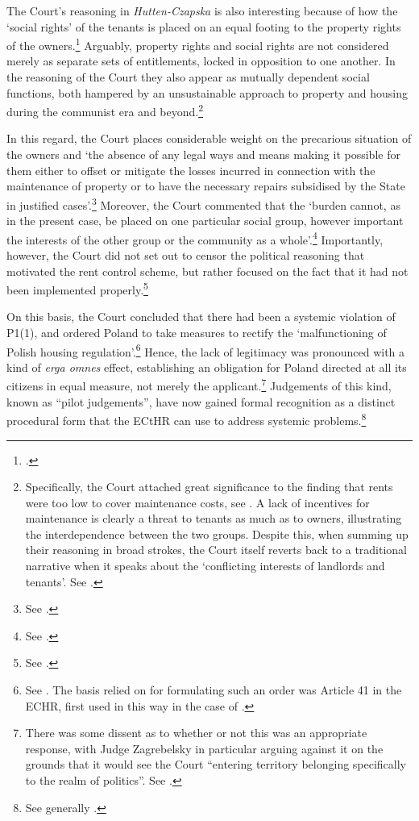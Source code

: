The Court's reasoning in {\it Hutten-Czapska} is also interesting because of how the `social rights' of the tenants is placed on an equal footing to the property rights of the owners.\footcite[225]{hutten06} Arguably, property rights and social rights are not considered merely as separate sets of entitlements, locked in opposition to one another. In the reasoning of the Court they also appear as mutually dependent social functions, both hampered by an unsustainable approach to property and housing during the communist era and beyond.\footnote{Specifically, the Court attached great significance to the finding that rents were too low to cover maintenance costs, see \cite[224]{hutten06}. A lack of incentives for maintenance is clearly a threat to tenants as much as to owners, illustrating the interdependence between the two groups. Despite this, when summing up their reasoning in broad strokes, the Court itself reverts back to a traditional narrative when it speaks about the `conflicting interests of landlords and tenants'. See \cite[225]{hutten06}.}

In this regard, the Court places considerable weight on the precarious situation of the owners and `the absence of any legal ways and means making it possible for them either to offset or mitigate the losses incurred in connection with the maintenance of property or to have the necessary repairs subsidised by the State in justified cases'.\footnote{See \cite[224]{hutten06}.} Moreover, the Court commented that the `burden cannot, as in the present case, be placed on one particular social group, however important the interests of the other group or the community as a whole'.\footnote{See \cite[225]{hutten06}.} Importantly, however, the Court did not set out to censor the political reasoning that motivated the rent control scheme, but rather focused on the fact that it had not been implemented properly.\footnote{See \cite[224]{hutten06}.}

On this basis, the Court concluded that there had been a systemic violation of P1(1), and ordered Poland to take measures to rectify the `malfunctioning of Polish housing regulation'.\footnote{See \cite[237]{hutten06}. The basis relied on for formulating such an order was Article 41 in the ECHR, first used in this way in the case of \cite{broniowski05}.} Hence, the lack of legitimacy was pronounced with a kind of {\it erga omnes} effect, establishing an obligation for Poland directed at all its citizens in equal measure, not merely the applicant.\footnote{There was some dissent as to whether or not this was an appropriate response, with Judge Zagrebelsky in particular arguing against it on the grounds that it would see the Court ``entering territory belonging specifically to the realm of politics''. See \cite{hutten06}.} Judgements of this kind, known as ``pilot judgements'', have now gained formal recognition as a distinct procedural form that the ECtHR can use to address systemic problems.\footnote{See generally \cite{leach10}.}

